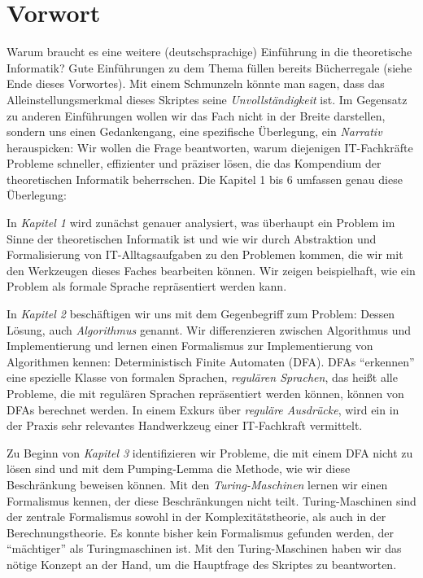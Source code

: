 \chapter{Vorwort}

Warum braucht es eine weitere (deutschsprachige) Einführung
in die theoretische Informatik?
Gute Einführungen zu dem Thema füllen bereits Bücherregale
(siehe Ende dieses Vorwortes).
Mit einem Schmunzeln könnte man sagen,
dass das Alleinstellungsmerkmal dieses Skriptes seine
\emph{Unvollständigkeit} ist.
Im Gegensatz zu anderen Einführungen wollen wir das Fach nicht in der Breite darstellen,
sondern uns einen Gedankengang, eine spezifische Überlegung,
ein \emph{Narrativ} herauspicken:
Wir wollen die Frage beantworten,
warum diejenigen IT-Fachkräfte Probleme
schneller, effizienter und präziser lösen,
die das Kompendium der theoretischen Informatik beherrschen.
Die Kapitel 1 bis 6 umfassen genau diese Überlegung:

In \emph{Kapitel 1} wird zunächst genauer analysiert,
was überhaupt ein Problem im Sinne der theoretischen Informatik ist
und wie wir durch Abstraktion und Formalisierung von IT-Alltagsaufgaben
zu den Problemen kommen, die wir mit den Werkzeugen dieses Faches bearbeiten können.
Wir zeigen beispielhaft,
wie ein Problem als formale Sprache repräsentiert werden kann.

In \emph{Kapitel 2} beschäftigen wir uns mit dem Gegenbegriff zum Problem:
Dessen Lösung, auch \emph{Algorithmus} genannt.
Wir differenzieren zwischen Algorithmus und Implementierung
und lernen einen Formalismus zur Implementierung von Algorithmen kennen:
Deterministisch Finite Automaten (DFA).
DFAs ``erkennen'' eine spezielle Klasse von formalen Sprachen,
\emph{regulären Sprachen},
das heißt alle Probleme, die mit regulären Sprachen repräsentiert werden können,
können von DFAs berechnet werden.
In einem Exkurs über \emph{reguläre Ausdrücke},
wird ein in der Praxis sehr relevantes Handwerkzeug einer IT-Fachkraft vermittelt.

Zu Beginn von \emph{Kapitel 3} identifizieren wir Probleme,
die mit einem DFA nicht zu lösen sind
und mit dem Pumping-Lemma die Methode, wie wir diese Beschränkung beweisen können.
Mit den \emph{Turing-Maschinen} lernen wir einen Formalismus kennen,
der diese Beschränkungen nicht teilt.
Turing-Maschinen sind der zentrale Formalismus sowohl
in der Komplexitätstheorie,
als auch in der Berechnungstheorie.
Es konnte bisher kein Formalismus gefunden werden,
der ``mächtiger'' als Turingmaschinen ist.
Mit den Turing-Maschinen haben wir das nötige Konzept an der Hand,
um die Hauptfrage des Skriptes zu beantworten.

